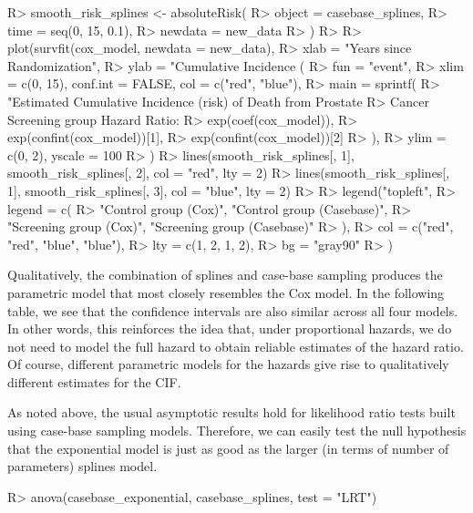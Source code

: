 \documentclass[
]{jss}
\begin{document}
\begin{CodeChunk}

\begin{CodeInput}
R> smooth_risk_splines <- absoluteRisk(
R>   object = casebase_splines,
R>   time = seq(0, 15, 0.1),
R>   newdata = new_data
R> )
R> 
R> plot(survfit(cox_model, newdata = new_data),
R>   xlab = "Years since Randomization",
R>   ylab = "Cumulative Incidence (%
R>   fun = "event",
R>   xlim = c(0, 15), conf.int = FALSE, col = c("red", "blue"),
R>   main = sprintf(
R>     "Estimated Cumulative Incidence (risk) of Death from Prostate 
R>                     Cancer Screening group Hazard Ratio: %
R>     exp(coef(cox_model)),
R>     exp(confint(cox_model))[1],
R>     exp(confint(cox_model))[2]
R>   ),
R>   ylim = c(0, 2), yscale = 100
R> )
R> lines(smooth_risk_splines[, 1], smooth_risk_splines[, 2], col = "red", lty = 2)
R> lines(smooth_risk_splines[, 1], smooth_risk_splines[, 3], col = "blue", lty = 2)
R> 
R> legend("topleft",
R>   legend = c(
R>     "Control group (Cox)", "Control group (Casebase)",
R>     "Screening group (Cox)", "Screening group (Casebase)"
R>   ),
R>   col = c("red", "red", "blue", "blue"),
R>   lty = c(1, 2, 1, 2),
R>   bg = "gray90"
R> )
\end{CodeInput}
\end{CodeChunk}

Qualitatively, the combination of splines and case-base sampling
produces the parametric model that most closely resembles the Cox model.
In the following table, we see that the confidence intervals are also
similar across all four models. In other words, this reinforces the idea
that, under proportional hazards, we do not need to model the full
hazard to obtain reliable estimates of the hazard ratio. Of course,
different parametric models for the hazards give rise to qualitatively
different estimates for the CIF.

As noted above, the usual asymptotic results hold for likelihood ratio
tests built using case-base sampling models. Therefore, we can easily
test the null hypothesis that the exponential model is just as good as
the larger (in terms of number of parameters) splines model.

\begin{CodeChunk}

\begin{CodeInput}
R> anova(casebase_exponential, casebase_splines, test = "LRT")
\end{CodeInput}
\end{CodeChunk}
\end{document}

